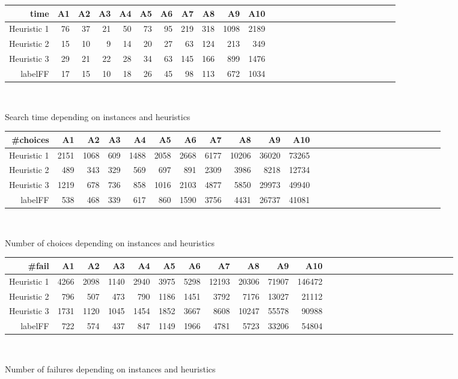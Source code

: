 \documentclass[a4paper ,12pt,french]{article}
\begin{document}
\begin{figure}[!h]
\begin{tabular}{|r||r|r|r|r|r|r|r|r|r|r|r|r|r|r|r|r|r|r|r|r|r|r|r|r|r|}
\hline
time&A1&A2&A3&A4&A5&A6&A7&A8&A9&A10\\
\hline
\hline
Heuristic 1&76&37&21&50&73&95&219&318&1098&2189\\
\hline
Heuristic 2&15&10&9&14&20&27&63&124&213&349\\
\hline
Heuristic 3&29&21&22&28&34&63&145&166&899&1476\\
\hline
labelFF&17&15&10&18&26&45&98&113&672&1034\\
\hline
\end{tabular}\\
\caption{Search time depending on instances and heuristics}
\end{figure}


\begin{figure}[!h]
\begin{tabular}{|r||r|r|r|r|r|r|r|r|r|r|r|r|r|r|r|r|r|r|r|r|r|r|r|r|r|}
\hline
\#choices&A1&A2&A3&A4&A5&A6&A7&A8&A9&A10\\
\hline
\hline
Heuristic 1&2151&1068&609&1488&2058&2668&6177&10206&36020&73265\\
\hline
Heuristic 2&489&343&329&569&697&891&2309&3986&8218&12734\\
\hline
Heuristic 3&1219&678&736&858&1016&2103&4877&5850&29973&49940\\
\hline
labelFF&538&468&339&617&860&1590&3756&4431&26737&41081\\
\hline

\end{tabular}\\
\caption{Number of choices depending on instances and heuristics}
\end{figure}

\begin{figure}[!h]
\begin{tabular}{|r||r|r|r|r|r|r|r|r|r|r|r|r|r|r|r|r|r|r|r|r|r|r|r|r|r|}
\hline
\#fail&A1&A2&A3&A4&A5&A6&A7&A8&A9&A10\\
\hline
\hline
Heuristic 1&4266&2098&1140&2940&3975&5298&12193&20306&71907&146472\\
\hline
Heuristic 2&796&507&473&790&1186&1451&3792&7176&13027&21112\\
\hline
Heuristic 3&1731&1120&1045&1454&1852&3667&8608&10247&55578&90988\\
\hline
labelFF&722&574&437&847&1149&1966&4781&5723&33206&54804\\
\hline
\end{tabular}\\
\caption{Number of failures depending on instances and heuristics}
\end{figure}
\end{document}
